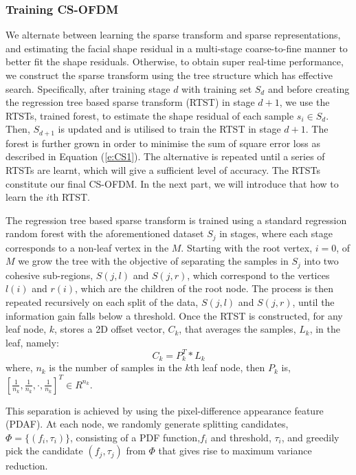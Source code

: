 \documentclass[a4paper, 10pt, conference]{ieeeconf}      %
\begin{document}
\subsubsection{Training CS-OFDM}
We alternate between learning the sparse transform and sparse representations, and estimating the facial shape residual
in a multi-stage coarse-to-fine manner to better fit the shape residuals. Otherwise,
to obtain super real-time performance, we construct the sparse transform using the tree structure which has effective search.
Specifically, after training stage $d$ with training set $S_d$ and before creating the regression tree based sparse transform (RTST)
in stage $d+1$, we use the RTSTs, trained forest, to
estimate the shape residual of each sample $s_i \in S_d$. Then, $S_{d+1}$ is updated and is utilised to train the RTST in stage $d+1$. The forest
is further grown in order to minimise the sum of square error loss as described in Equation (\ref{e:CS1}).
The alternative is repeated until a series of RTSTs are learnt, which will give a sufficient level of accuracy. The RTSTs constitute our
final CS-OFDM. In the next part, we will introduce that how to learn the $i$th RTST.

The regression tree based sparse transform is trained using a standard regression random forest \cite{breiman2001random} with the 
aforementioned dataset $S_j$ in stages, where each stage corresponds to a non-leaf vertex in the $M$. Starting with the root vertex, $i = 0$,
of $M$ we grow the tree with the objective of separating the samples in $S_j$ into two cohesive sub-regions, $S(j,l)$ and $S(j,r)$, which correspond
to the vertices $l(i)$ and $r(i)$, which are the children of the root node. The process is then repeated recursively on each split of the data,
$S(j,l)$ and $S(j,r)$, until the information gain falls below a threshold. Once the RTST is constructed, for any leaf node, $k$,
stores a 2D offset vector, $C_k$, that averages the samples, $L_k$, in the leaf, namely:
\begin{equation}
    \label{e:barwq8}
    C_k =  P_k^T * L_k
\end{equation}
where, $n_k$ is the number of samples in the $k$th leaf node, then $P_k$ is, $[\frac{1}{n_k},\frac{1}{n_k},\cdot,\frac{1}{n_k}]^T \in R^{n_k}$.

This separation is achieved by using the pixel-difference appearance feature (PDAF). At each node, we randomly generate splitting candidates,
$\Phi = \{(f_i,\tau_i)\}$, consisting of a PDF function,$f_i$ and threshold, $\tau_i$, and greedily pick the candidate $(f_j,\tau_j)$
from $\Phi$ that gives rise to maximum variance reduction.
\end{document}
